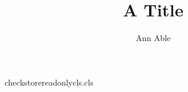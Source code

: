 \begin{filecontents*}[force]{checkstorereadonlycls.cls}
\newcount\aucount
\def\author#1{\advance\aucount by 1 \gdef\@author{#1}}
\def\corresp#1{\gdef\@corresp{#1}}\def\ps@firstp{\def\@oddfoot{\@corresp\hfil}\let\@evenfoot\@oddfoot\def\@oddhead{}}
\renewcommand\maketitle{\par{\@title\par}\ifnum\aucount>0 {\@author\par}{\thispagestyle{firstp}}\fi}
\end{filecontents*}
\documentclass{checkstorereadonlycls}
\title{A Title}\author{Ann Able}
\maketitle
Body text.

